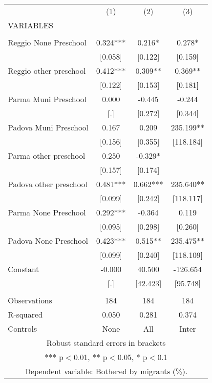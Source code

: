\begin{tabular}{lccc} \hline
 & (1) & (2) & (3) \\
VARIABLES &  &  &  \\ \hline
 &  &  &  \\
Reggio None Preschool & 0.324*** & 0.216* & 0.278* \\
 & [0.058] & [0.122] & [0.159] \\
Reggio other preschool & 0.412*** & 0.309** & 0.369** \\
 & [0.122] & [0.153] & [0.181] \\
Parma Muni Preschool & 0.000 & -0.445 & -0.244 \\
 & [.] & [0.272] & [0.344] \\
Padova Muni Preschool & 0.167 & 0.209 & 235.199** \\
 & [0.156] & [0.355] & [118.184] \\
Parma other preschool & 0.250 & -0.329* &  \\
 & [0.157] & [0.174] &  \\
Padova other preschool & 0.481*** & 0.662*** & 235.640** \\
 & [0.099] & [0.242] & [118.117] \\
Parma None Preschool & 0.292*** & -0.364 & 0.119 \\
 & [0.095] & [0.298] & [0.260] \\
Padova None Preschool & 0.423*** & 0.515** & 235.475** \\
 & [0.099] & [0.240] & [118.109] \\
Constant & -0.000 & 40.500 & -126.654 \\
 & [.] & [42.423] & [95.748] \\
 &  &  &  \\
Observations & 184 & 184 & 184 \\
R-squared & 0.050 & 0.281 & 0.374 \\
 Controls & None & All & Inter \\ \hline
\multicolumn{4}{c}{ Robust standard errors in brackets} \\
\multicolumn{4}{c}{ *** p$<$0.01, ** p$<$0.05, * p$<$0.1} \\
\multicolumn{4}{c}{ Dependent variable: Bothered by migrants (\%).} \\
\end{tabular}
